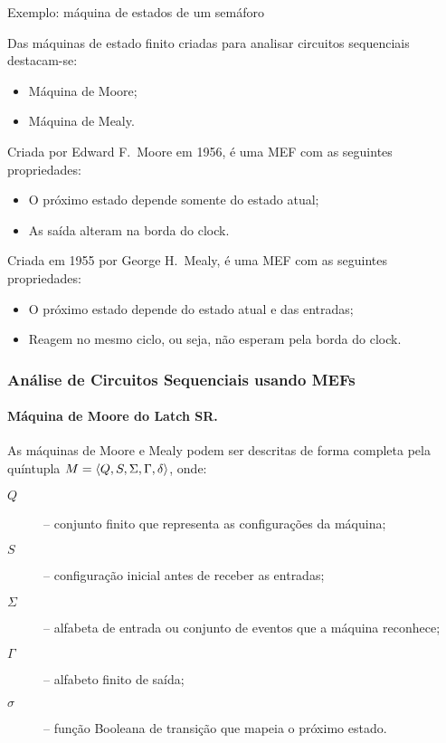 \noindent Exemplo: máquina de estados de um semáforo

\myfigure


Das máquinas de estado finito criadas para analisar circuitos
sequenciais destacam-se:

\begin{itemize}
\item Máquina de Moore;
\item Máquina de Mealy.
\end{itemize}



Criada por Edward F.\ Moore em 1956, é uma MEF com as seguintes
propriedades:

\begin{itemize}
\item O próximo estado depende somente do estado atual;
\item As saída alteram na borda do clock.
\end{itemize}


\myfigure



Criada em 1955 por George H.\ Mealy, é uma MEF com as seguintes
propriedades:

\begin{itemize}
\item O próximo estado depende do estado atual e das entradas;
\item Reagem no mesmo ciclo, ou seja, não esperam pela borda do clock.
\end{itemize}

\myfigure


\subsubsection{Análise de Circuitos Sequenciais usando MEFs}


\paragraph{Máquina de Moore do Latch SR.} As máquinas de Moore e Mealy
podem ser descritas de forma completa pela quíntupla $M=
\<Q,S,\Sigma,\Gamma,\delta> $, onde:

\begin{description}
  \item[$Q$] -- conjunto finito que representa as configurações da máquina;
  \item[$S$] -- configuração inicial antes de receber as entradas;
  \item[$\Sigma$] -- alfabeta de entrada ou conjunto de eventos que a
    máquina reconhece;
  \item[$\Gamma$] -- alfabeto finito de saída;
  \item[$\sigma$] -- função Booleana de transição que mapeia o próximo
    estado.

\end{description}

